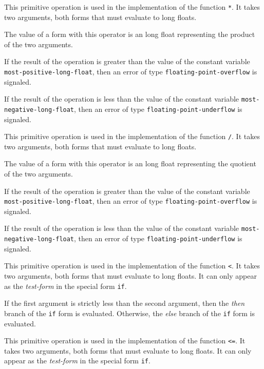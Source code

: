  {}

This primitive operation is used in the implementation of the
\commonlisp{} function \texttt{*}.  It takes two arguments, both forms
that must evaluate to long floats.

The value of a form with this operator is an long float
representing the product of the two arguments.

If the result of the operation is greater than the value of the
constant variable \texttt{most-positive-long-float}, then an error of
type \texttt{floating-point-overflow} is signaled.

If the result of the operation is less than the value of the constant
variable \texttt{most-negative-long-float}, then an error of type
\texttt{floating-point-underflow} is signaled.

 {}

This primitive operation is used in the implementation of the
\commonlisp{} function \texttt{/}.  It takes two arguments, both forms
that must evaluate to long floats.

The value of a form with this operator is an long float
representing the quotient of the two arguments.

If the result of the operation is greater than the value of the
constant variable \texttt{most-positive-long-float}, then an error of
type \texttt{floating-point-overflow} is signaled.

If the result of the operation is less than the value of the constant
variable \texttt{most-negative-long-float}, then an error of type
\texttt{floating-point-underflow} is signaled.

 {}

This primitive operation is used in the implementation of the
\commonlisp{} function \texttt{<}.  It takes two arguments, both forms
that must evaluate to long floats.  It can only appear as the
\emph{test-form} in the special form \texttt{if}.

If the first argument is strictly less than the second argument, then
the \emph{then} branch of the \texttt{if} form is evaluated.
Otherwise, the \emph{else} branch of the \texttt{if} form is
evaluated.

 {}

This primitive operation is used in the implementation of the
\commonlisp{} function \texttt{<=}.  It takes two arguments, both forms
that must evaluate to long floats.  It can only appear as the
\emph{test-form} in the special form \texttt{if}.

